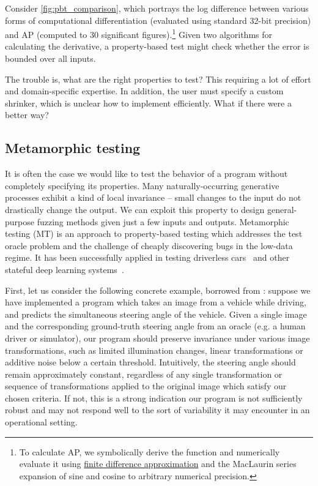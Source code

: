 %
Consider \autoref{fig:pbt_comparison}, which portrays the log difference between various forms of computational differentiation (evaluated using standard 32-bit precision) and AP (computed to 30 significant figures).\hspace{-.08em}\footnote{To calculate AP, we symbolically derive the function and numerically evaluate it using \hyperref[sec:fdm]{finite difference approximation} and the MacLaurin series expansion of sine and cosine to arbitrary numerical precision.} Given two algorithms for calculating the derivative, a property-based test might check whether the error is bounded over all inputs.

The trouble is, what are the right properties to test? This requiring a lot of effort and domain-specific expertise. In addition, the user must specify a custom shrinker, which is unclear how to implement efficiently. What if there were a better way?

\subsection{Metamorphic testing}\label{subsec:metamorphic-testing}

It is often the case we would like to test the behavior of a program without completely specifying its properties. Many naturally-occurring generative processes exhibit a kind of local invariance -- small changes to the input do not drastically change the output. We can exploit this property to design general-purpose fuzzing methods given just a few inputs and outputs. Metamorphic testing (MT) is an approach to property-based testing which addresses the test oracle problem and the challenge of cheaply discovering bugs in the low-data regime. It has been successfully applied in testing driverless cars~\citep{zhou2019metamorphic, pei2017deepxplore, tian2018deeptest} and other stateful deep learning systems~\citep{du2018deepcruiser}.

First, let us consider the following concrete example, borrowed from \citet{tian2018deeptest}: suppose we have implemented a program which takes an image from a vehicle while driving, and predicts the simultaneous steering angle of the vehicle. Given a single image and the corresponding ground-truth steering angle from an oracle (e.g. a human driver or simulator), our program should preserve invariance under various image transformations, such as limited illumination changes, linear transformations or additive noise below a certain threshold. Intuitively, the steering angle should remain approximately constant, regardless of any single transformation or sequence of transformations applied to the original image which satisfy our chosen criteria. If not, this is a strong indication our program is not sufficiently robust and may not respond well to the sort of variability it may encounter in an operational setting.

